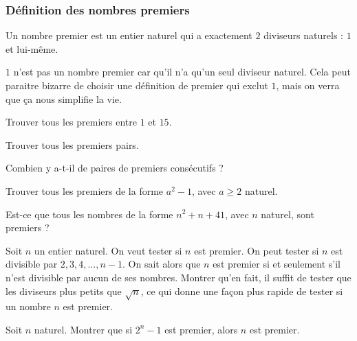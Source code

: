 \subsubsection{Définition des nombres premiers}


\begin{dfn}
Un nombre premier est un entier naturel qui a exactement $2$ diviseurs naturels : $1$ et lui-même.
\end{dfn}

\begin{rem}
$1$ n'est pas un nombre premier car qu'il n'a qu'un seul diviseur naturel. Cela peut paraitre bizarre de choisir une définition de premier qui exclut $1$, mais on verra que ça nous simplifie la vie.
\end{rem}


\begin{exo}
Trouver tous les premiers entre $1$ et $15$.
\end{exo}


\begin{exo}
Trouver tous les premiers pairs.
\end{exo}


\begin{exo}
Combien y a-t-il de paires de premiers consécutifs ?
\end{exo}


\begin{exo}
Trouver tous les premiers de la forme $a^2 - 1$, avec $a\ge 2$ naturel.
\end{exo}


\begin{exo}
Est-ce que tous les nombres de la forme $n^2 + n + 41$, avec $n$ naturel, sont premiers ?
\end{exo}


\begin{exo}
Soit $n$ un entier naturel. On veut tester si $n$ est premier.
On peut tester si $n$ est divisible par $2, 3, 4, \dots, n-1$. On sait alors que $n$ est premier si et seulement s’il n'est divisible par aucun de ses nombres. Montrer qu'en fait, il suffit de tester que les diviseurs plus petits que $\sqrt n$, ce qui donne une façon plus rapide de tester si un nombre $n$ est premier.
\end{exo}


\begin{exo}[Difficile]
Soit $n$ naturel. Montrer que si $2^n - 1$ est premier, alors $n$ est premier.
\end{exo}


